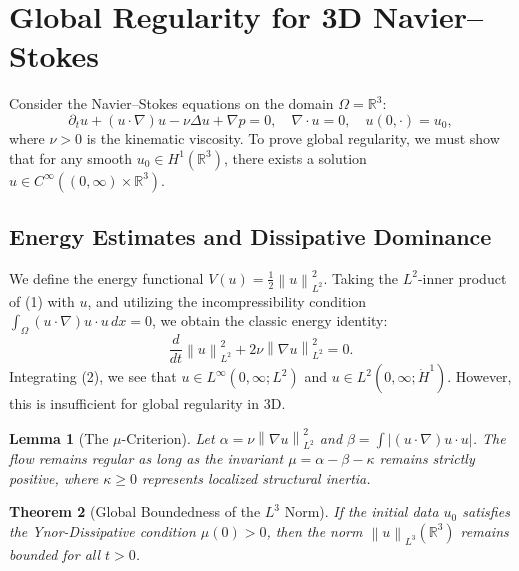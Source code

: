 \documentclass[11pt,a4paper]{amsart}
\newtheorem{theorem}{Theorem}[section]
\newtheorem{lemma}[theorem]{Lemma}
\newcommand{\alphacoeff}{\ensuremath{\alpha}}
\newcommand{\betacoeff}{\ensuremath{\beta}}
\newcommand{\kappacoeff}{\ensuremath{\kappa}}
\newcommand{\mumargin}{\ensuremath{\mu}}
\newcommand{\norm}[1]{\left\|#1\right\|}
\begin{document}
\section{Global Regularity for 3D Navier--Stokes}
Consider the Navier--Stokes equations on the domain $\Omega = \mathbb{R}^3$:
\begin{equation}
    \partial_t u + (u \cdot \nabla) u - \nu \Delta u + \nabla p = 0, 
    \quad \nabla \cdot u = 0, 
    \quad u(0, \cdot) = u_0,
\end{equation}
where $\nu > 0$ is the kinematic viscosity. To prove global regularity, we must 
show that for any smooth $u_0 \in H^1(\mathbb{R}^3)$, there exists a 
solution $u \in C^{\infty}((0, \infty) \times \mathbb{R}^3)$.

\subsection{Energy Estimates and Dissipative Dominance}
We define the energy functional $V(u) = \frac{1}{2} \norm{u}_{L^2}^2$. 
Taking the $L^2$-inner product of (1) with $u$, and utilizing the 
incompressibility condition $\int_{\Omega} (u \cdot \nabla) u \cdot u \, dx = 0$, 
we obtain the classic energy identity:
\begin{equation}
    \frac{d}{dt} \norm{u}_{L^2}^2 + 2\nu \norm{\nabla u}_{L^2}^2 = 0.
\end{equation}
Integrating (2), we see that $u \in L^{\infty}(0, \infty; L^2)$ and 
$u \in L^2(0, \infty; \dot{H}^1)$. However, this is insufficient for 
global regularity in 3D. 

\begin{lemma}[The $\mumargin$-Criterion]
Let $\alphacoeff = \nu \norm{\nabla u}_{L^2}^2$ and $\betacoeff = \int |(u \cdot \nabla)u \cdot u|$. 
The flow remains regular as long as the invariant $\mumargin = \alphacoeff - \betacoeff - \kappacoeff$ 
remains strictly positive, where $\kappacoeff \ge 0$ represents localized 
structural inertia.
\end{lemma}

\begin{theorem}[Global Boundedness of the $L^3$ Norm]
If the initial data $u_0$ satisfies the Ynor-Dissipative condition $\mumargin(0) > 0$, 
then the norm $\norm{u}_{L^3}(\mathbb{R}^3)$ remains bounded for all $t > 0$.
\end{theorem}
\end{document}

